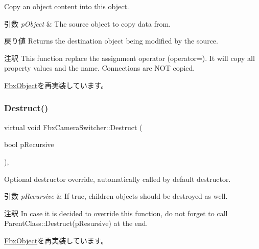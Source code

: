 Copy an object content into this object. 
\begin{DoxyParams}{引数}
{\em p\+Object} & The source object to copy data from. \\
\hline
\end{DoxyParams}
\begin{DoxyReturn}{戻り値}
Returns the destination object being modified by the source. 
\end{DoxyReturn}
\begin{DoxyRemark}{注釈}
This function replace the assignment operator (operator=). It will copy all property values and the name. Connections are N\+OT copied. 
\end{DoxyRemark}


\hyperlink{class_fbx_object_a0c0c5adb38284d14bb82c04d54504a3e}{Fbx\+Object}を再実装しています。

\mbox{\label{class_fbx_camera_switcher_aba10821ff1b60cb32a21da2fc55ea711}} 
\subsubsection{\texorpdfstring{Destruct()}{Destruct()}}
{\footnotesize\ttfamily virtual void Fbx\+Camera\+Switcher\+::\+Destruct (\begin{DoxyParamCaption}\item[{bool}]{p\+Recursive }\end{DoxyParamCaption})\hspace{0.3cm}{\ttfamily [protected]}, {\ttfamily [virtual]}}

Optional destructor override, automatically called by default destructor. 
\begin{DoxyParams}{引数}
{\em p\+Recursive} & If true, children objects should be destroyed as well. \\
\hline
\end{DoxyParams}
\begin{DoxyRemark}{注釈}
In case it is decided to override this function, do not forget to call Parent\+Class\+::\+Destruct(p\+Resursive) at the end. 
\end{DoxyRemark}


\hyperlink{class_fbx_object_a123e084d9b32b29c28af6384b7c3c608}{Fbx\+Object}を再実装しています。

\mbox{\label{class_fbx_camera_switcher_ad42aacc90ece1f0295e51db102ae48ad}} 
